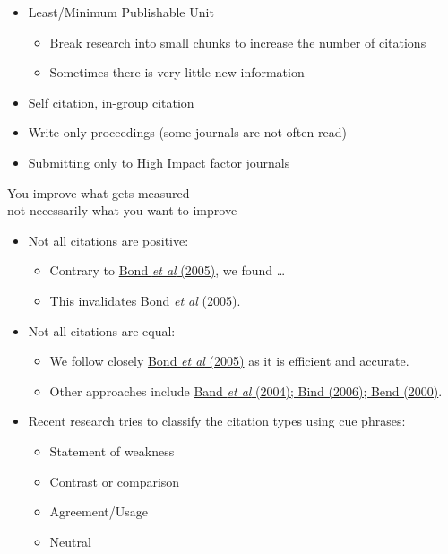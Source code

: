 \documentclass[a4paper,landscape,headrule,footrule,xetex]{foils}
\begin{document}



\begin{itemize}
\item Least/Minimum Publishable Unit
  \begin{itemize}
  \item Break research into small chunks to  increase the number of citations
  \item Sometimes there is very little new information
  \end{itemize}
\item Self citation, in-group citation
\item Write only proceedings (some journals are not often read)
\item Submitting only to High Impact factor journals
\end{itemize}

\begin{center}
  You improve what gets measured 
  \\  not necessarily what you want to improve
\end{center}


\begin{itemize}
\item Not all citations are positive:
  \begin{itemize}
  \item Contrary to \ul{Bond \textit{et al} (2005)}, we found \ldots
  \item This invalidates \ul{Bond \textit{et al} (2005)}.
  \end{itemize}
\item Not all citations are equal:
  \begin{itemize}
  \item We follow closely \ul{Bond \textit{et al} (2005)} as it is efficient and accurate.
  \item Other approaches include \ul{Band \textit{et al} (2004); Bind (2006); Bend (2000)}.
  \end{itemize}
\item Recent research tries to classify the citation types using cue phrases:
  \begin{itemize}
  \item Statement of weakness
  \item Contrast or comparison
  \item Agreement/Usage
  \item Neutral 
  \end{itemize}
\end{itemize}
\end{document}
